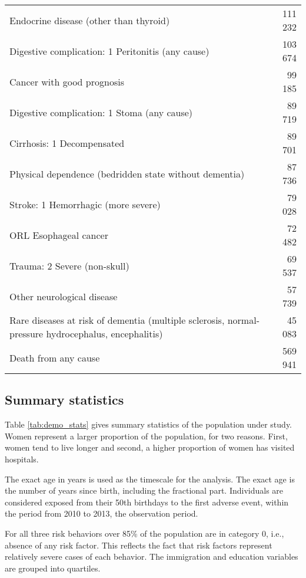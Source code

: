 \documentclass{article}
\begin{document}
\begin{table}
\begin{tabular}[t]{>{\raggedright\arraybackslash}p{20em}r}
Endocrine disease (other than thyroid) & 111 232\\
Digestive complication: 1 Peritonitis (any cause) & 103 674\\
Cancer with good prognosis & 99 185\\
Digestive complication: 1 Stoma (any cause) & 89 719\\
Cirrhosis: 1 Decompensated & 89 701\\
Physical dependence (bedridden state without dementia) & 87 736\\
Stroke: 1 Hemorrhagic (more severe) & 79 028\\
ORL Esophageal cancer & 72 482\\
Trauma: 2 Severe (non-skull) & 69 537\\
Other neurological disease & 57 739\\
Rare diseases at risk of dementia (multiple sclerosis, normal-pressure hydrocephalus, encephalitis) & 45 083\\
Death from any cause & 569 941\\
\bottomrule
\end{tabular}
\end{table}

\hypertarget{summary-statistics}{%
\subsection{\texorpdfstring{Summary statistics
\label{sec:stats}}{Summary statistics }}\label{summary-statistics}}

Table \ref{tab:demo_stats} gives summary statistics of the population
under study. Women represent a larger proportion of the population, for
two reasons. First, women tend to live longer and second, a higher
proportion of women has visited hospitals.

The exact age in years is used as the timescale for the analysis. The
exact age is the number of years since birth, including the fractional
part. Individuals are considered exposed from their 50th birthdays to
the first adverse event, within the period from 2010 to 2013, the
observation period.

For all three risk behaviors over 85\% of the population are in category
0, i.e., absence of any risk factor. This reflects the fact that risk
factors represent relatively severe cases of each behavior. The
immigration and education variables are grouped into quartiles.
\end{document}

